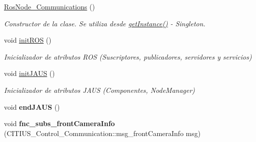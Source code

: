 \begin{DoxyCompactItemize}
\item 
\hypertarget{class_ros_node___communications_a0c9f2fc612072587b2dde1122a071e5f}{\hyperlink{class_ros_node___communications_a0c9f2fc612072587b2dde1122a071e5f}{\-Ros\-Node\-\_\-\-Communications} ()}\label{class_ros_node___communications_a0c9f2fc612072587b2dde1122a071e5f}

\begin{DoxyCompactList}\small\item\em \-Constructor de la clase. \-Se utiliza desde \hyperlink{class_ros_node___communications_a24ba6db36ccf6ff2b4f696ecc5435862}{get\-Instance()} -\/ \-Singleton. \end{DoxyCompactList}\item 
\hypertarget{class_ros_node___communications_afc991c89bd41b1a67426fc1dffd2e9cd}{void \hyperlink{class_ros_node___communications_afc991c89bd41b1a67426fc1dffd2e9cd}{init\-R\-O\-S} ()}\label{class_ros_node___communications_afc991c89bd41b1a67426fc1dffd2e9cd}

\begin{DoxyCompactList}\small\item\em \-Inicializador de atributos \-R\-O\-S (\-Suscriptores, publicadores, servidores y servicios) \end{DoxyCompactList}\item 
\hypertarget{class_ros_node___communications_ad4e63fea3cf05f8d1a289b8c51099fa4}{void \hyperlink{class_ros_node___communications_ad4e63fea3cf05f8d1a289b8c51099fa4}{init\-J\-A\-U\-S} ()}\label{class_ros_node___communications_ad4e63fea3cf05f8d1a289b8c51099fa4}

\begin{DoxyCompactList}\small\item\em \-Inicializador de atributos \-J\-A\-U\-S (\-Componentes, \-Node\-Manager) \end{DoxyCompactList}\item 
\hypertarget{class_ros_node___communications_a253a94b0127a76a4af7bdd0fc2c20d9c}{void {\bfseries end\-J\-A\-U\-S} ()}\label{class_ros_node___communications_a253a94b0127a76a4af7bdd0fc2c20d9c}

\item 
\hypertarget{class_ros_node___communications_a5461e052b06dfa0412ca514606c08971}{void {\bfseries fnc\-\_\-subs\-\_\-front\-Camera\-Info} (\-C\-I\-T\-I\-U\-S\-\_\-\-Control\-\_\-\-Communication\-::msg\-\_\-front\-Camera\-Info msg)}\label{class_ros_node___communications_a5461e052b06dfa0412ca514606c08971}


\end{DoxyCompactItemize}
